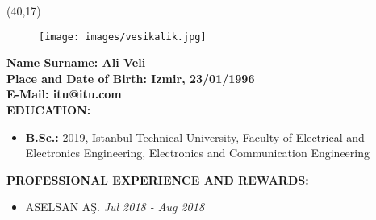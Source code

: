 \vspace{10mm}

\newsavebox{\mysquare}
\savebox{\mysquare}{\textcolor{black}{\rule[2.3pt]{3.4pt}{3.4pt}}}

\setlength{\TPHorizModule}{10pt}
\setlength{\TPVertModule}{10pt}
\begin{textblock}{1}(40,17)
  \begin{figure}[p]
    \texttt{[image: images/vesikalik.jpg]}
  \end{figure}

\end{textblock}
\textbf{Name Surname: {\normalfont Ali Veli}} \\

\vspace{-3mm}
\textbf{Place and Date of Birth: {\normalfont Izmir, 23/01/1996}} \\

\vspace{-3mm}
\textbf{E-Mail: {\normalfont itu@itu.com}} \\


\textbf{EDUCATION:}
\vspace{-3mm}
\begin{itemize}
  \item \textbf{B.Sc.:} 2019, Istanbul Technical University, Faculty of Electrical and Electronics Engineering, Electronics and Communication Engineering
\end{itemize}

\textbf{PROFESSIONAL EXPERIENCE AND REWARDS:}
\vspace{-3mm}
\begin{itemize}
  \item ASELSAN A\c{S}. \hfill \textit{Jul 2018 - Aug 2018}
\end{itemize}


\vspace{-3mm}

\newpage

\vspace{10mm}



\vspace{-3mm}

